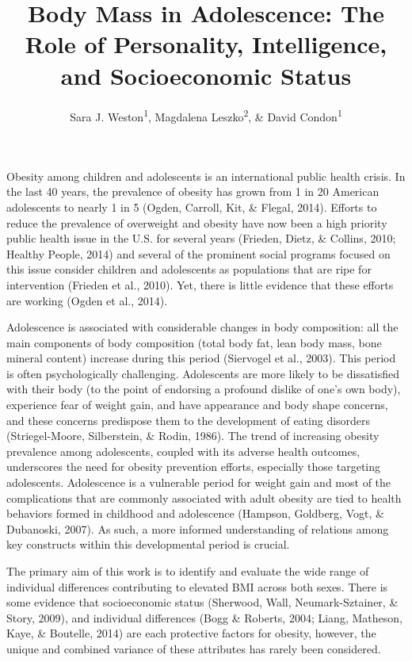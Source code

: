 \documentclass[man]{apa6}
\affiliation{
\vspace{0.5cm}
\textsuperscript{1} University of Oregon\\\textsuperscript{2} University of Szczecin}
\title{Body Mass in Adolescence: The Role of Personality, Intelligence, and Socioeconomic Status}
\author{Sara J. Weston\textsuperscript{1}, Magdalena Leszko\textsuperscript{2}, \& David Condon\textsuperscript{1}}
\date{}
\begin{document}
\maketitle

\setlength{\parskip}{0pt}
 \raggedbottom

Obesity among children and adolescents is an international public health crisis. In the last 40 years, the prevalence of obesity has grown from 1 in 20 American adolescents to nearly 1 in 5 (Ogden, Carroll, Kit, \& Flegal, 2014). Efforts to reduce the prevalence of overweight and obesity have now been a high priority public health issue in the U.S. for several years (Frieden, Dietz, \& Collins, 2010; Healthy People, 2014) and several of the prominent social programs focused on this issue consider children and adolescents as populations that are ripe for intervention (Frieden et al., 2010). Yet, there is little evidence that these efforts are working (Ogden et al., 2014).

Adolescence is associated with considerable changes in body composition: all the main components of body composition (total body fat, lean body mass, bone mineral content) increase during this period (Siervogel et al., 2003). This period is often psychologically challenging. Adolescents are more likely to be dissatisfied with their body (to the point of endorsing a profound dislike of one's own body), experience fear of weight gain, and have appearance and body shape concerns, and these concerns predispose them to the development of eating disorders (Striegel-Moore, Silberstein, \& Rodin, 1986). The trend of increasing obesity prevalence among adolescents, coupled with its adverse health outcomes, underscores the need for obesity prevention efforts, especially those targeting adolescents. Adolescence is a vulnerable period for weight gain and most of the complications that are commonly associated with adult obesity are tied to health behaviors formed in childhood and adolescence (Hampson, Goldberg, Vogt, \& Dubanoski, 2007). As such, a more informed understanding of relations among key constructs within this developmental period is crucial.

The primary aim of this work is to identify and evaluate the wide range of individual differences contributing to elevated BMI across both sexes. There is some evidence that socioeconomic status (Sherwood, Wall, Neumark-Sztainer, \& Story, 2009), and individual differences (Bogg \& Roberts, 2004; Liang, Matheson, Kaye, \& Boutelle, 2014) are each protective factors for obesity, however, the unique and combined variance of these attributes has rarely been considered.
\end{document}
